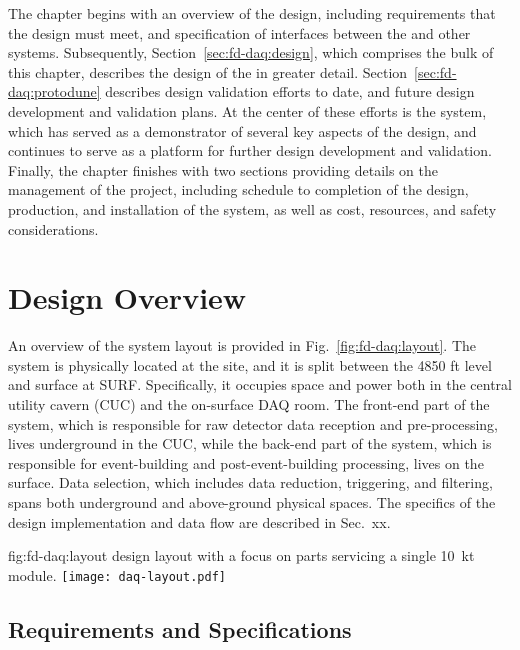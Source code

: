 The chapter begins with an overview of the  design,
including requirements that the design must meet, and specification of
interfaces between the   and other   systems. 
Subsequently, Section~\ref{sec:fd-daq:design}, which comprises the
bulk of this chapter, describes the design of the 
 in greater detail.
Section~\ref{sec:fd-daq:protodune} describes design validation efforts
to date, and future design development and validation plans. At the
center of these efforts is the 
  system, which has served as a demonstrator of several
key aspects of the      design, and continues to serve as a
platform for further design development and validation. 
Finally, the chapter finishes with two sections providing details on
the management of the
 project, including schedule to completion of the design, 
production, and installation of the system, as well as cost, resources, and
safety considerations.

\section{Design Overview}
\label{sec:fd-daq:overview}

An overview of the    system layout is
provided in Fig.~\ref{fig:fd-daq:layout}. The system is
physically located at the  site, and it is split between the
4850 ft level and surface at SURF. Specifically, it occupies space and
power both in the central utility cavern (CUC) and the on-surface DAQ
room.  The front-end part of the system, which is responsible for
raw detector data reception and pre-processing, lives
underground in the CUC, while the back-end part of the system, which is responsible for
event-building and post-event-building processing, lives on the surface. Data selection, which includes
data reduction, triggering, and filtering, spans both underground and
above-ground physical spaces. The specifics of the design implementation and data flow
are described in Sec.~xx.


\begin{dunefigure}{fig:fd-daq:layout}{ design layout with a focus on parts servicing a single \SI{10}{\kilo\tonne} module.  
  }
  \texttt{[image: daq-layout.pdf]}
\end{dunefigure}

\subsection{Requirements and Specifications}
\label{sec:fd-daq:requirements}

